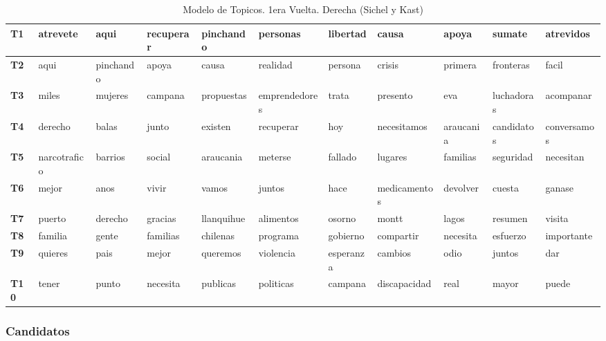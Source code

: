 \documentclass[
  10pt,
  letterpaper,
]{report}
\begin{document}
\begin{table}[!h]

\caption{\label{tab:Tabla8_der}Modelo de Topicos. 1era Vuelta. Derecha (Sichel y Kast)}
\centering
\fontsize{6}{8}\selectfont
\begin{tabular}[t]{>{\raggedright\arraybackslash}p{0.08in}|>{\raggedright\arraybackslash}p{0.4in}|>{\raggedright\arraybackslash}p{0.4in}|>{\raggedright\arraybackslash}p{0.4in}|>{\raggedright\arraybackslash}p{0.4in}|>{\raggedright\arraybackslash}p{0.4in}|>{\raggedright\arraybackslash}p{0.4in}|>{\raggedright\arraybackslash}p{0.4in}|>{\raggedright\arraybackslash}p{0.4in}|>{\raggedright\arraybackslash}p{0.4in}|l}
\hline
T1 & atrevete & aqui & recuperar & pinchando & personas & libertad & causa & apoya & sumate & atrevidos\\
\hline
\textbf{T2} & aqui & pinchando & apoya & causa & realidad & persona & crisis & primera & fronteras & facil\\
\hline
\textbf{T3} & miles & mujeres & campana & propuestas & emprendedores & trata & presento & eva & luchadoras & acompanar\\
\hline
\textbf{T4} & derecho & balas & junto & existen & recuperar & hoy & necesitamos & araucania & candidatos & conversamos\\
\hline
\textbf{T5} & narcotrafico & barrios & social & araucania & meterse & fallado & lugares & familias & seguridad & necesitan\\
\hline
\textbf{T6} & mejor & anos & vivir & vamos & juntos & hace & medicamentos & devolver & cuesta & ganase\\
\hline
\textbf{T7} & puerto & derecho & gracias & llanquihue & alimentos & osorno & montt & lagos & resumen & visita\\
\hline
\textbf{T8} & familia & gente & familias & chilenas & programa & gobierno & compartir & necesita & esfuerzo & importante\\
\hline
\textbf{T9} & quieres & pais & mejor & queremos & violencia & esperanza & cambios & odio & juntos & dar\\
\hline
\textbf{T10} & tener & punto & necesita & publicas & politicas & campana & discapacidad & real & mayor & puede\\
\hline
\end{tabular}
\end{table}

\hypertarget{candidatos}{%
\subsubsection{Candidatos}\label{candidatos}}
\end{document}
